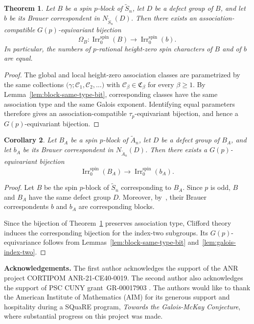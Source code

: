 \documentclass[reqno]{amsart}
\DeclareMathOperator{\Irr}{Irr}
\newcommand{\tSym}{\widetilde{S}}
\newcommand{\tAlt}{\widetilde{A}}
\newtheorem{theorem}{Theorem}[section] %
\newtheorem{corollary}[theorem]{Corollary}
\theoremstyle{definition}
\begin{document}
\begin{theorem}
\label{thm:blockwise-main}
Let $B$ be a spin $p$-block of $\tSym_n$, let $D$ be a defect group of
$B$, and let $b$ be its Brauer correspondent in $N_{\tSym_n}(D)$.
Then there exists an association-compatible $G(p)$-equivariant
bijection
\[
\Omega_B:
\Irr_0^{\mathrm{spin}}(B)
\longrightarrow
\Irr_0^{\mathrm{spin}}(b).
\]
In particular, the numbers of $p$-rational height-zero spin characters of
$B$ and of $b$ are equal.
\end{theorem}

\begin{proof}
The global and local height-zero association classes are parametrized by
the same collections $ \bigl( \gamma; \mathcal C_1,\mathcal C_2,\ldots
\bigr)$ with $\mathcal C_\beta\in\mathfrak C_\beta$ for every
$\beta\geq1$.
By Lemma~\ref{lem:block-same-type-bit}, corresponding classes have the
same association type and the same Galois exponent. Identifying equal
parameters therefore gives an association-compatible
$\tau_p$-equivariant bijection, and hence a $G(p)$-equivariant
bijection. 
\end{proof}

\begin{corollary}
\label{cor:blockwise-alternating}
Let $B_A$ be a spin $p$-block of $\tAlt_n$, let $D$ be a defect
group of $B_A$, and let $b_A$ be its Brauer
correspondent in $N_{\tAlt_n}(D)$. Then there exists a
$G(p)$-equivariant bijection
\[
\Irr_0^{\mathrm{spin}}(B_A)
\longrightarrow
\Irr_0^{\mathrm{spin}}(b_A).
\]
\end{corollary}

\begin{proof}
Let $B$ be the spin $p$-block of $\tSym_n$ corresponding to $B_A$.
Since $p$ is odd, $B$ and $B_A$ have the same defect group $D$.
Moreover, by~\cite[Lemma~2.3]{MichlerOlsson}, their Brauer
correspondents $b$ and $b_A$ are corresponding blocks.

Since the bijection of Theorem~\ref{thm:blockwise-main} preserves
association type, Clifford theory induces the corresponding bijection for
the index-two subgroups. Its $G(p)$-equivariance follows from
Lemmas~\ref{lem:block-same-type-bit} and~\ref{lem:galois-index-two}.
\end{proof}


{\bf Acknowledgements.} The first author acknowledges the support of the
ANR project CORTIPOM ANR-21-CE40-0019. The second author also acknowledges
the support of PSC CUNY grant GR-00017903 . 
The authors would like to thank the American Institute of Mathematics
(AIM) for its generous support and hospitality during a SQuaRE program,
\emph{Towards the Galois-McKay Conjecture}, where substantial progress on
this project was made. 



\end{document}

